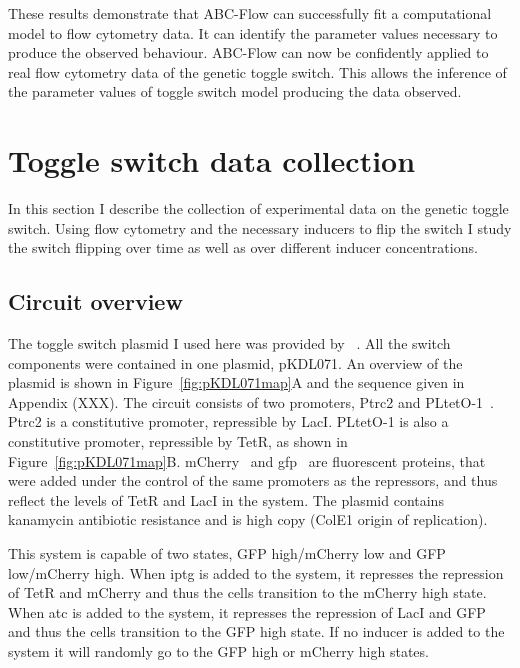 These results demonstrate that ABC-Flow can successfully fit a computational model to flow cytometry data. It can identify the parameter values necessary to produce the observed behaviour. ABC-Flow can now be confidently applied to real flow cytometry data of the genetic toggle switch. This allows the inference of the parameter values of toggle switch model producing the data observed. %

\clearpage
\section{Toggle switch data collection}

In this section I describe the collection of experimental data on the genetic toggle switch. Using flow cytometry and the necessary inducers to flip the switch I study the switch flipping over time as well as over different inducer concentrations. 

\subsection{Circuit overview}

The toggle switch plasmid I used here was provided by ~\textcite{Litcofsky:2012gr}. All the switch components were contained in one plasmid, pKDL071. An overview of the plasmid is shown in Figure~\ref{fig:pKDL071map}A and the sequence given in Appendix (XXX). The circuit consists of two promoters, Ptrc2 and PLtetO-1~\autocite{Lutz:1997ti}. Ptrc2 is a constitutive promoter, repressible by LacI. PLtetO-1 is also a constitutive promoter, repressible by TetR, as shown in Figure~\ref{fig:pKDL071map}B. mCherry~\autocite{Shaner:2004vy} and \acrshort{gfp}~\autocite{SHIMOMURA:1962va} are fluorescent proteins, that were added under the control of the same promoters as the repressors, and thus reflect the levels of TetR and LacI in the system. The plasmid contains kanamycin antibiotic resistance and is high copy (ColE1 origin of replication).

This system is capable of two states, GFP high/mCherry low and GFP low/mCherry high. When \acrshort{iptg} is added to the system, it represses the repression of TetR and mCherry and thus the cells transition to the mCherry high state. When \acrshort{atc} is added to the system, it represses the repression of LacI and GFP and thus the cells transition to the GFP high state. If no inducer is added to the system it will randomly go to the GFP high or mCherry high states.

